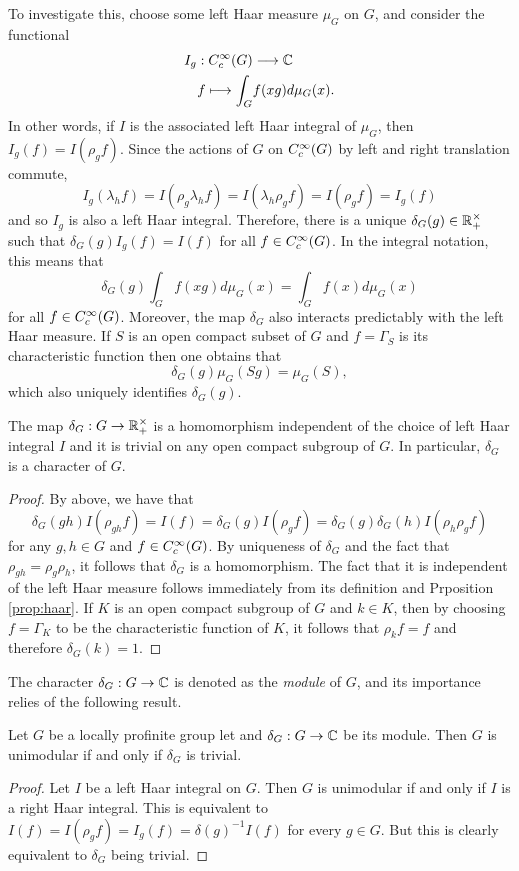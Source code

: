 To investigate this, choose some left Haar measure $\mu_G$ on $G$, and consider the functional
\begin{align*}
    I_g:C_c^{\infty}(G)&\longrightarrow\mathbb{C}\\
    f\longmapsto\int_G& f(xg)d\mu_G(x).
\end{align*}
In other words, if $I$ is the associated left Haar integral of $\mu_G$, then $I_g(f)=I(\rho_g f)$. Since the actions of $G$ on $C_c^{\infty}(G)$ by left and right translation commute, $$I_g(\lambda_h f)=I(\rho_g\lambda_h f)=I(\lambda_h\rho_g f)=I(\rho_g f)=I_g(f)$$
and so $I_g$ is also a left Haar integral. Therefore, there is a unique $\delta_G(g)\in \mathbb{R}_+^{\times}$ such that $\delta_G(g)I_g(f)=I(f)$ for all $f\in C_c^{\infty}(G)$. In the integral notation, this means that 
$$\delta_G(g)\int_G f(xg)d\mu_G(x)=\int_G f(x)d\mu_G(x)$$
for all $f\in C_c^{\infty}(G)$. Moreover, the map $\delta_G$ also interacts predictably with the left Haar measure. If $S$ is an open compact subset of $G$ and $f=\Gamma_S$ is its characteristic function then one obtains that 
$$\delta_G(g)\mu_G(Sg)=\mu_G(S),$$
which also uniquely identifies $\delta_G(g)$.

\begin{lemma}
    The map $\delta_G:G\to\mathbb{R}_+^{\times}$ is a homomorphism independent of the choice of left Haar integral $I$ and it is trivial on any open compact subgroup of $G$. In particular, $\delta_G$ is a character of $G$.
\end{lemma}
\begin{proof}
    By above, we have that 
    $$\delta_G(gh)I(\rho_{gh}f)=I(f)=\delta_G(g)I(\rho_g f)=\delta_G(g)\delta_G(h)I(\rho_h\rho_g f)$$
    for any $g,h\in G$ and $f\in C_c^{\infty}(G)$.
    By uniqueness of $\delta_G$ and the fact that $\rho_{gh}=\rho_g\rho_h$, it follows that $\delta_G$ is a homomorphism. The fact that it is independent of the left Haar measure follows immediately from its definition and Prposition \ref{prop:haar}. 
    If $K$ is an open compact subgroup of $G$ and $k\in K$, then by choosing $f=\Gamma_K$ to be the characteristic function of $K$, it follows that $\rho_k f= f$ and therefore $\delta_G(k)=1$.
\end{proof}

The character $\delta_G:G\to\mathbb{C}$ is denoted as the \textit{module} of $G$, and its importance relies of the following result.

\begin{lemma}
    Let $G$ be a locally profinite group let and $\delta_G:G\to\mathbb{C}$ be its module. Then $G$ is unimodular if and only if $\delta_G$ is trivial. 
\end{lemma}
\begin{proof}
    Let $I$ be a left Haar integral on $G$. Then $G$ is unimodular if and only if $I$ is a right Haar integral. This is equivalent to $I(f)=I(\rho_g f)=I_g(f)=\delta(g)^{-1}I(f)$ for every $g\in G$. But this is clearly equivalent to $\delta_G$ being trivial. 
\end{proof}


